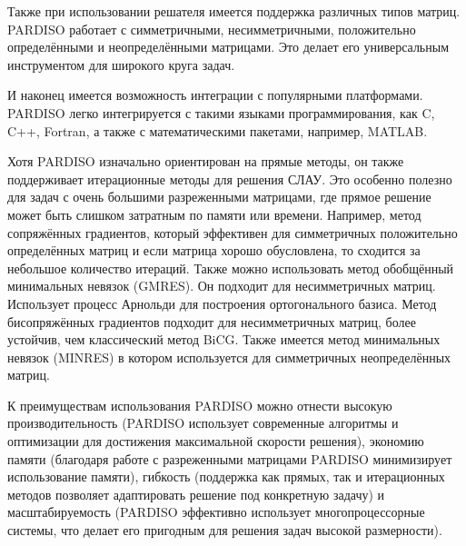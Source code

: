Также при использовании решателя имеется поддержка различных типов матриц. PARDISO работает с симметричными, несимметричными, положительно определёнными и неопределёнными матрицами. Это делает его универсальным инструментом для широкого круга задач.

И наконец имеется возможность интеграции с популярными платформами. PARDISO легко интегрируется с такими языками программирования, как C, C++, Fortran, а также с математическими пакетами, например, MATLAB.

Хотя PARDISO изначально ориентирован на прямые методы, он также поддерживает итерационные методы для решения СЛАУ. Это особенно полезно для задач с очень большими разреженными матрицами, где прямое решение может быть слишком затратным по памяти или времени. Например, метод сопряжённых градиентов, который эффективен для симметричных положительно определённых матриц и если матрица хорошо обусловлена, то сходится за небольшое количество итераций. Также можно использовать метод обобщённый минимальных невязок (GMRES). Он подходит для несимметричных матриц. Использует процесс Арнольди для построения ортогонального базиса. Метод бисопряжённых градиентов подходит для несимметричных матриц, более устойчив, чем классический метод BiCG. Также имеется метод минимальных невязок (MINRES) в котором используется для симметричных неопределённых матриц.

К преимуществам использования PARDISO можно отнести высокую производительность (PARDISO использует современные алгоритмы и оптимизации для достижения максимальной скорости решения), экономию памяти (благодаря работе с разреженными матрицами PARDISO минимизирует использование памяти), гибкость (поддержка как прямых, так и итерационных методов позволяет адаптировать решение под конкретную задачу) и масштабируемость (PARDISO эффективно использует многопроцессорные системы, что делает его пригодным для решения задач высокой размерности).

